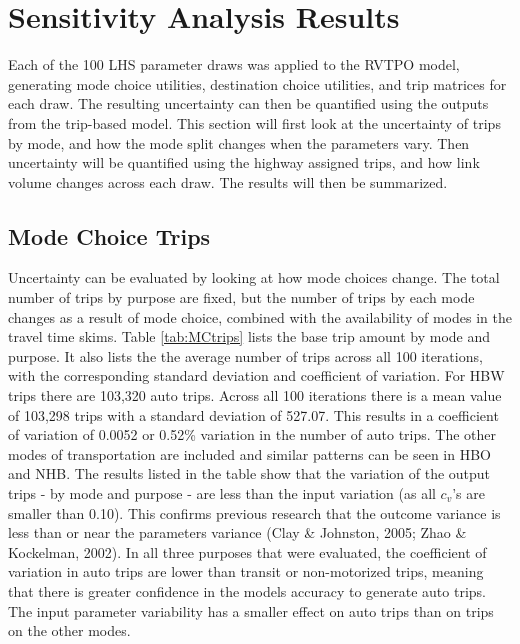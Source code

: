 \documentclass[fancy, masters, twoside]{byuthesis}
\begin{document}
\hypertarget{sensitivity-analysis-results}{%
\chapter{Sensitivity Analysis Results}\label{sensitivity-analysis-results}}

Each of the 100 LHS parameter draws was applied to the RVTPO model, generating mode choice utilities, destination choice utilities, and trip matrices for each draw. The resulting uncertainty can then be quantified using the outputs from the trip-based model. This section will first look at the uncertainty of trips by mode, and how the mode split changes when the parameters vary. Then uncertainty will be quantified using the highway assigned trips, and how link volume changes across each draw. The results will then be summarized.

\hypertarget{mode-choice-trips}{%
\section{Mode Choice Trips}\label{mode-choice-trips}}

Uncertainty can be evaluated by looking at how mode choices change. The total number of trips by purpose are fixed, but the number of trips by each mode changes as a result of mode choice, combined with the availability of modes in the travel time skims. Table \ref{tab:MCtrips} lists the base trip amount by mode and purpose. It also lists the the average number of trips across all 100 iterations, with the corresponding standard deviation and coefficient of variation. For HBW trips there are 103,320 auto trips. Across all 100 iterations there is a mean value of 103,298 trips with a standard deviation of 527.07. This results in a coefficient of variation of 0.0052 or 0.52\% variation in the number of auto trips. The other modes of transportation are included and similar patterns can be seen in HBO and NHB. The results listed in the table show that the variation of the output trips - by mode and purpose - are less than the input variation (as all \(c_v\)'s are smaller than 0.10). This confirms previous research that the outcome variance is less than or near the parameters variance (Clay \& Johnston, 2005; Zhao \& Kockelman, 2002). In all three purposes that were evaluated, the coefficient of variation in auto trips are lower than transit or non-motorized trips, meaning that there is greater confidence in the models accuracy to generate auto trips. The input parameter variability has a smaller effect on auto trips than on trips on the other modes.
\end{document}
